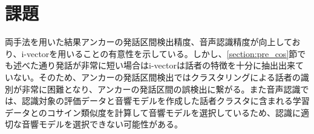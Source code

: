 \section{課題}
両手法を用いた結果アンカーの発話区間検出精度、音声認識精度が向上しており、i-vectorを用いることの有意性を示している。しかし、\ref{section:pre_cos}節でも述べた通り発話が非常に短い場合はi-vectorは話者の特徴を十分に抽出出来ていない。そのため、アンカーの発話区間検出ではクラスタリングによる話者の識別が非常に困難となり、アンカーの発話区間の誤検出に繋がる。また音声認識では、認識対象の評価データと音響モデルを作成した話者クラスタに含まれる学習データとのコサイン類似度を計算して音響モデルを選択しているため、認識に適切な音響モデルを選択できない可能性がある。

